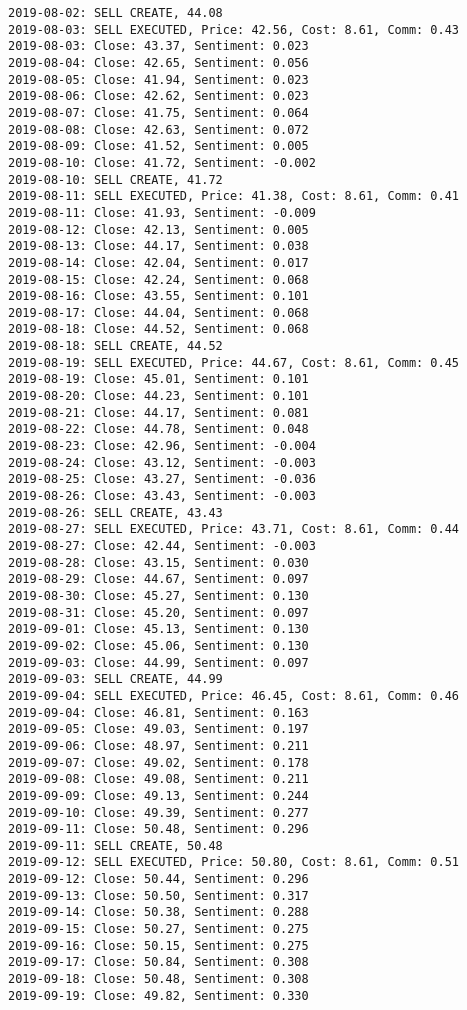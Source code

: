 \documentclass[11pt]{article}
\begin{document}
\begin{Verbatim}[commandchars=\\\{\}]
2019-08-02: SELL CREATE, 44.08
2019-08-03: SELL EXECUTED, Price: 42.56, Cost: 8.61, Comm: 0.43
2019-08-03: Close: 43.37, Sentiment: 0.023
2019-08-04: Close: 42.65, Sentiment: 0.056
2019-08-05: Close: 41.94, Sentiment: 0.023
2019-08-06: Close: 42.62, Sentiment: 0.023
2019-08-07: Close: 41.75, Sentiment: 0.064
2019-08-08: Close: 42.63, Sentiment: 0.072
2019-08-09: Close: 41.52, Sentiment: 0.005
2019-08-10: Close: 41.72, Sentiment: -0.002
2019-08-10: SELL CREATE, 41.72
2019-08-11: SELL EXECUTED, Price: 41.38, Cost: 8.61, Comm: 0.41
2019-08-11: Close: 41.93, Sentiment: -0.009
2019-08-12: Close: 42.13, Sentiment: 0.005
2019-08-13: Close: 44.17, Sentiment: 0.038
2019-08-14: Close: 42.04, Sentiment: 0.017
2019-08-15: Close: 42.24, Sentiment: 0.068
2019-08-16: Close: 43.55, Sentiment: 0.101
2019-08-17: Close: 44.04, Sentiment: 0.068
2019-08-18: Close: 44.52, Sentiment: 0.068
2019-08-18: SELL CREATE, 44.52
2019-08-19: SELL EXECUTED, Price: 44.67, Cost: 8.61, Comm: 0.45
2019-08-19: Close: 45.01, Sentiment: 0.101
2019-08-20: Close: 44.23, Sentiment: 0.101
2019-08-21: Close: 44.17, Sentiment: 0.081
2019-08-22: Close: 44.78, Sentiment: 0.048
2019-08-23: Close: 42.96, Sentiment: -0.004
2019-08-24: Close: 43.12, Sentiment: -0.003
2019-08-25: Close: 43.27, Sentiment: -0.036
2019-08-26: Close: 43.43, Sentiment: -0.003
2019-08-26: SELL CREATE, 43.43
2019-08-27: SELL EXECUTED, Price: 43.71, Cost: 8.61, Comm: 0.44
2019-08-27: Close: 42.44, Sentiment: -0.003
2019-08-28: Close: 43.15, Sentiment: 0.030
2019-08-29: Close: 44.67, Sentiment: 0.097
2019-08-30: Close: 45.27, Sentiment: 0.130
2019-08-31: Close: 45.20, Sentiment: 0.097
2019-09-01: Close: 45.13, Sentiment: 0.130
2019-09-02: Close: 45.06, Sentiment: 0.130
2019-09-03: Close: 44.99, Sentiment: 0.097
2019-09-03: SELL CREATE, 44.99
2019-09-04: SELL EXECUTED, Price: 46.45, Cost: 8.61, Comm: 0.46
2019-09-04: Close: 46.81, Sentiment: 0.163
2019-09-05: Close: 49.03, Sentiment: 0.197
2019-09-06: Close: 48.97, Sentiment: 0.211
2019-09-07: Close: 49.02, Sentiment: 0.178
2019-09-08: Close: 49.08, Sentiment: 0.211
2019-09-09: Close: 49.13, Sentiment: 0.244
2019-09-10: Close: 49.39, Sentiment: 0.277
2019-09-11: Close: 50.48, Sentiment: 0.296
2019-09-11: SELL CREATE, 50.48
2019-09-12: SELL EXECUTED, Price: 50.80, Cost: 8.61, Comm: 0.51
2019-09-12: Close: 50.44, Sentiment: 0.296
2019-09-13: Close: 50.50, Sentiment: 0.317
2019-09-14: Close: 50.38, Sentiment: 0.288
2019-09-15: Close: 50.27, Sentiment: 0.275
2019-09-16: Close: 50.15, Sentiment: 0.275
2019-09-17: Close: 50.84, Sentiment: 0.308
2019-09-18: Close: 50.48, Sentiment: 0.308
2019-09-19: Close: 49.82, Sentiment: 0.330

\end{Verbatim}
\end{document}
